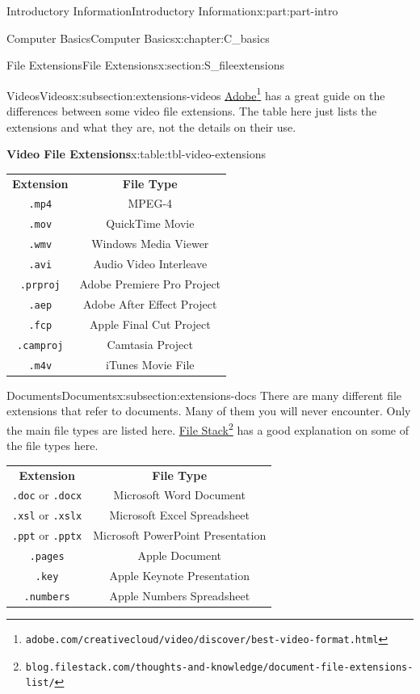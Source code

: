 \documentclass[oneside,10pt,]{book}
\newcommand{\tabularfont}{\relax}
\newcommand{\mono}[1]{\texttt{#1}}
\begin{document}
\begin{partptx}{Introductory Information}{}{Introductory Information}{}{}{x:part:part-intro}
\begin{chapterptx}{Computer Basics}{}{Computer Basics}{}{}{x:chapter:C_basics}
\begin{sectionptx}{File Extensions}{}{File Extensions}{}{}{x:section:S_fileextensions}
\begin{subsectionptx}{Videos}{}{Videos}{}{}{x:subsection:extensions-videos}
%
\href{https://www.adobe.com/creativecloud/video/discover/best-video-format.html}{Adobe}\footnote{\nolinkurl{adobe.com/creativecloud/video/discover/best-video-format.html}\label{g:fn:idm480894536}} has a great guide on the differences between some video file extensions. The table here just lists the extensions and what they are, not the details on their use.%
\begin{tableptx}{\textbf{Video File Extensions}}{x:table:tbl-video-extensions}{}%
\centering%
{\tabularfont%
\begin{tabular}{cc}
\textbf{Extension}&\textbf{File Type}\tabularnewline[0pt]
\mono{.mp4}&MPEG-4\tabularnewline[0pt]
\mono{.mov}&QuickTime Movie\tabularnewline[0pt]
\mono{.wmv}&Windows Media Viewer\tabularnewline[0pt]
\mono{.avi}&Audio Video Interleave\tabularnewline[0pt]
\mono{.prproj}&Adobe Premiere Pro Project\tabularnewline[0pt]
\mono{.aep}&Adobe After Effect Project\tabularnewline[0pt]
\mono{.fcp}&Apple Final Cut Project\tabularnewline[0pt]
\mono{.camproj}&Camtasia Project\tabularnewline[0pt]
\mono{.m4v}&iTunes Movie File
\end{tabular}
}%
\end{tableptx}%
\end{subsectionptx}
%
%
\typeout{************************************************}
\typeout{************************************************}
%
\begin{subsectionptx}{Documents}{}{Documents}{}{}{x:subsection:extensions-docs}
%
There are many different file extensions that refer to documents. Many of them you will never encounter. Only the main file types are listed here. \href{https://blog.filestack.com/thoughts-and-knowledge/document-file-extensions-list/}{File Stack}\footnote{\nolinkurl{blog.filestack.com/thoughts-and-knowledge/document-file-extensions-list/}\label{g:fn:idm480877000}} has a good explanation on some of the file types here.%
\begin{center}%
{\tabularfont%
\begin{tabular}{cc}
\textbf{Extension}&\textbf{File Type}\tabularnewline[0pt]
\mono{.doc} or \mono{.docx}&Microsoft Word Document\tabularnewline[0pt]
\mono{.xsl} or \mono{.xslx}&Microsoft Excel Spreadsheet\tabularnewline[0pt]
\mono{.ppt} or \mono{.pptx}&Microsoft PowerPoint Presentation\tabularnewline[0pt]
\mono{.pages}&Apple Document\tabularnewline[0pt]
\mono{.key}&Apple Keynote Presentation\tabularnewline[0pt]
\mono{.numbers}&Apple Numbers Spreadsheet\tabularnewline[0pt]

\end{tabular}}
\end{center}
\end{subsectionptx}
\end{sectionptx}
\end{chapterptx}
\end{partptx}
\end{document}
